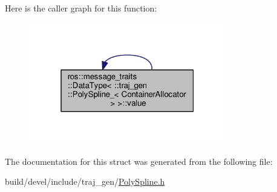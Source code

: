 Here is the caller graph for this function\+:
\nopagebreak
\begin{figure}[H]
\begin{center}
\leavevmode
\includegraphics[width=244pt]{structros_1_1message__traits_1_1_data_type_3_01_1_1traj__gen_1_1_poly_spline___3_01_container_allocator_01_4_01_4_a863abb98380ce9000983ca441a37a7b8_icgraph}
\end{center}
\end{figure}




The documentation for this struct was generated from the following file\+:\begin{DoxyCompactItemize}
\item 
build/devel/include/traj\+\_\+gen/\hyperlink{_poly_spline_8h}{Poly\+Spline.\+h}\end{DoxyCompactItemize}
